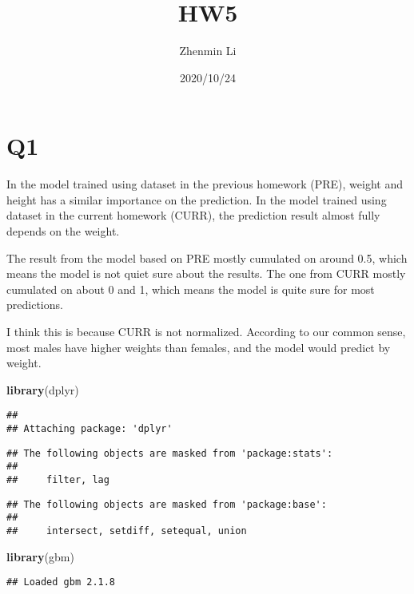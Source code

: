 \documentclass[]{article}
\title{HW5}
\author{Zhenmin Li}
\date{2020/10/24}
\newenvironment{Shaded}{\begin{snugshade}}{\end{snugshade}}
\newcommand{\KeywordTok}[1]{\textcolor[rgb]{0.13,0.29,0.53}{\textbf{#1}}}
\newcommand{\NormalTok}[1]{#1}
\begin{document}
\maketitle

\hypertarget{q1}{%
\section{Q1}\label{q1}}

In the model trained using dataset in the previous homework (PRE),
weight and height has a similar importance on the prediction. In the
model trained using dataset in the current homework (CURR), the
prediction result almost fully depends on the weight.

The result from the model based on PRE mostly cumulated on around 0.5,
which means the model is not quiet sure about the results. The one from
CURR mostly cumulated on about 0 and 1, which means the model is quite
sure for most predictions.

I think this is because CURR is not normalized. According to our common
sense, most males have higher weights than females, and the model would
predict by weight.

\begin{Shaded}
\begin{Highlighting}[]
\KeywordTok{library}\NormalTok{(dplyr)}
\end{Highlighting}
\end{Shaded}

\begin{verbatim}
## 
## Attaching package: 'dplyr'
\end{verbatim}

\begin{verbatim}
## The following objects are masked from 'package:stats':
## 
##     filter, lag
\end{verbatim}

\begin{verbatim}
## The following objects are masked from 'package:base':
## 
##     intersect, setdiff, setequal, union
\end{verbatim}

\begin{Shaded}
\begin{Highlighting}[]
\KeywordTok{library}\NormalTok{(gbm)}
\end{Highlighting}
\end{Shaded}

\begin{verbatim}
## Loaded gbm 2.1.8
\end{verbatim}
\end{document}
